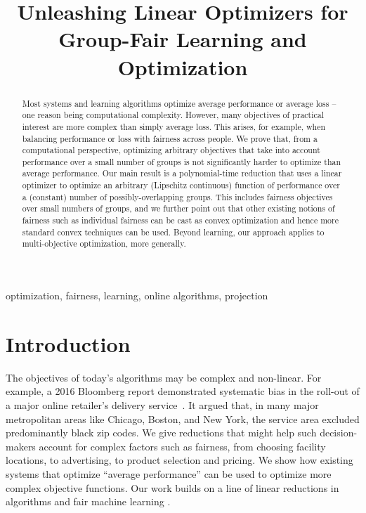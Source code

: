 \documentclass[final, 12pt]{colt2018} %
\title[Unleashing Linear Optimizers for Group-Fair Learning and Optimization]{Unleashing Linear Optimizers for Group-Fair Learning and Optimization}
\begin{document}
\maketitle

\begin{abstract}
Most systems and learning algorithms optimize average performance or average loss -- one reason being computational complexity. However, many objectives of practical interest are more complex than simply average loss. This arises, for example, when balancing performance or loss with fairness across people. We prove that, from a computational perspective, optimizing arbitrary objectives that take into account performance over a small number of groups is not significantly harder to optimize than average performance. Our main result is a polynomial-time reduction that uses a linear optimizer to optimize an arbitrary (Lipschitz continuous) function of performance over a (constant) number of possibly-overlapping groups. This includes fairness objectives over small numbers of groups, and we further point out that other existing notions of fairness such as individual fairness can be cast as convex optimization and hence more standard convex techniques can be used. Beyond learning, our approach applies to multi-objective optimization, more generally.
\end{abstract}

\begin{keywords}
optimization, fairness, learning, online algorithms, projection
\end{keywords}

\section{Introduction}
The objectives of today's algorithms may be complex and non-linear. For example, a 2016 Bloomberg report demonstrated systematic bias in the roll-out of a major online retailer's delivery service~\citep{Ingold16}. It argued that, in many major metropolitan areas like Chicago, Boston, and New York, the service area excluded predominantly black zip codes. We give reductions that might help such decision-makers account for complex factors such as fairness, from choosing facility locations, to advertising, to product selection and pricing. We show how existing systems  that optimize ``average performance'' can be used to optimize more complex objective functions. Our work builds on a line of linear reductions in algorithms and fair machine learning \citep[e.g.,][]{revisitingFrankWolfe, KalaiV05,NarasimhanRS015,Agarwal17,dwork18a}.
\end{document}
